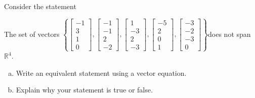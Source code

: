 
\begin{exerciseStatement}


Consider the statement 
\begin{center}\begin{minipage}{0.8\textwidth}
 The set of vectors \( \left\{ \left[\begin{array}{c}
-1 \\
3 \\
1 \\
0
\end{array}\right] , \left[\begin{array}{c}
-1 \\
-1 \\
2 \\
-2
\end{array}\right] , \left[\begin{array}{c}
1 \\
-3 \\
2 \\
-3
\end{array}\right] , \left[\begin{array}{c}
-5 \\
2 \\
0 \\
1
\end{array}\right] , \left[\begin{array}{c}
-3 \\
-2 \\
-3 \\
0
\end{array}\right] \right\} \)does not span \(\mathbb{R}^4\). 
\end{minipage}\end{center}
    


\begin{enumerate}[(a)]
\item  Write an equivalent statement using a vector equation.
\item  Explain why your statement is true or false.
\end{enumerate}
    
\end{exerciseStatement}
    
